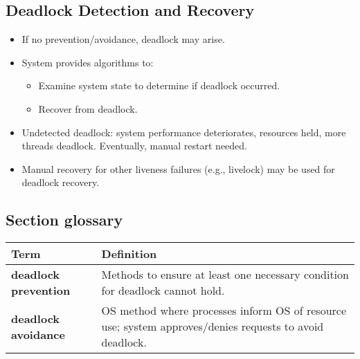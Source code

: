 \subsection*{Deadlock Detection and Recovery}
\begin{itemize}[noitemsep, topsep=0pt]
    \item If no prevention/avoidance, deadlock may arise.
    \item System provides algorithms to:
    \begin{itemize}[noitemsep, topsep=0pt]
        \item Examine system state to determine if deadlock occurred.
        \item Recover from deadlock.
    \end{itemize}
    \item Undetected deadlock: system performance deteriorates, resources held, more threads deadlock. Eventually, manual restart needed.
    \item Manual recovery for other liveness failures (e.g., livelock) may be used for deadlock recovery.
\end{itemize}

\subsection*{Section glossary}
\begin{tabular}{p{}p{}}
    \toprule
    \textbf{Term} & \textbf{Definition} \\
    \midrule
    \textbf{deadlock prevention} & Methods to ensure at least one necessary condition for deadlock cannot hold. \\
    \textbf{deadlock avoidance} & OS method where processes inform OS of resource use; system approves/denies requests to avoid deadlock. \\
    \bottomrule
\end{tabular}
